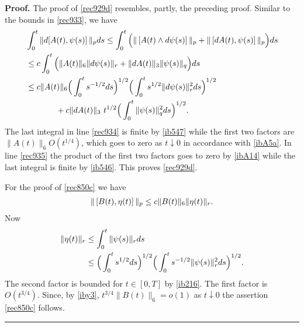\documentclass[12pt]{article}
\newenvironment{proof}[1][Proof]{\textbf{#1.} }{\ \rule{0.5em}{0.5em}}
\def \({\Big(}
\def \){\Big)}
\def \eref{\eqref}
\numberwithin{equation}{section}
\begin{document}
\begin{proof}
    The proof of \eref{rec929d} resembles, partly, the preceding proof.
        Similar to the bounds in \eref{rec933}, we have
    \begin{align}
 &\int_0^t \| d[A(t), \psi(s)]\, \|_p ds 
 \le  \int_0^t \( \|\, [A(t)\wedge d\psi(s)]\, \|_p  + \|\, [ dA(t), \psi(s)]\, \|_p \)ds  \notag\\
 & \le c \int_0^t\( \|A(t)\|_6 \|d\psi(s)\|_r  + \|dA(t)\|_3  \|\psi(s)\|_q\) ds \notag\\
 &\le c \|A(t)\|_6 \(\int_0^t s^{-1/2} ds \)^{1/2}\(\int_0^t s^{1/2} \|d\psi(s)\|_r^2 ds \)^{1/2} \label{rec934} \\
 &\ \ \ \ \ \ \ \ \ \ \ +c \| d A(t)\|_3\ t^{1/2} \( \int_0^t \|\psi(s)\|_q^2 ds \)^{1/2} .                \label{rec935}
 \end{align} 
 The last  integral in line \eref{rec934} is finite by \eref{ib547} while the first two
  factors are $\| A(t)\|_ 6 O(t^{1/4})$,
 which goes to zero as $t \downarrow 0$ in accordance with \eref{ibA5a}. 
 In line \eref{rec935} the product of the first two factors goes to zero by \eref{ibA14} while
  the last integral is finite by \eref{ib546}. This proves \eref{rec929d}. 



       For the proof of \eref{rec850c} we have
    \begin{align}
    \|\, [B(t), \eta(t)]\, \|_p \le c \|B(t)\|_6 \|\eta(t)\|_r. \notag
      \end{align}
  Now
  \begin{align}
   \|\eta(t)\|_r &\le \int_0^t \|\psi(s)\|_r ds    \notag\\
   &\le \(\int_0^t s^{1/2} ds\)^{1/2} \(\int_0^t s^{-1/2} \|\psi(s)\|_r^2 ds \)^{1/2}. \notag
   \end{align}
   The second factor is bounded for $t \in [0, T]$ by \eref{ib216}. The first factor  is $O(t^{3/4})$.
   Since, by \eref{iby3},  $t^{3/4} \|B(t)\|_6 =o(1)$ as $ t \downarrow 0$ the  assertion \eref{rec850c} follows.
    \end{proof}
\end{document}
